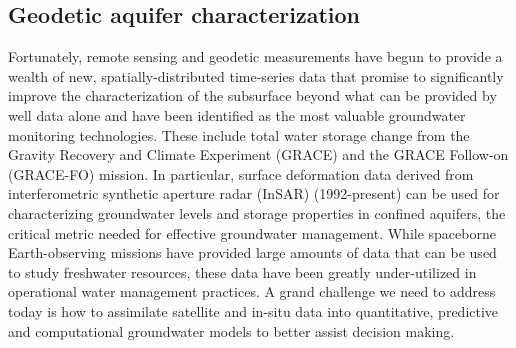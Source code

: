 \documentclass[11pt,final]{article}%
\def\squeeze{\parskip=0pt\itemsep=0pt}
\let\itemOld=\item
\def\item{\squeeze\itemOld}
\begin{document}
\subsection{Geodetic aquifer characterization}
Fortunately, remote sensing and geodetic measurements have begun to provide a wealth of new, spatially-distributed time-series data that promise to significantly improve the characterization of the subsurface beyond what can be provided by well data alone and have been identified as the most valuable groundwater monitoring technologies. These include total water storage change from the Gravity Recovery and Climate Experiment (GRACE) and the GRACE Follow-on (GRACE-FO) mission. In particular, surface deformation data derived from interferometric synthetic aperture radar (InSAR) (1992-present) can be used for characterizing groundwater levels and storage properties in confined aquifers, the critical metric needed for effective groundwater management. While spaceborne Earth-observing missions have provided large amounts of data that can be used to study freshwater resources, these data have been greatly under-utilized in operational water management practices. A grand challenge we need to address today is how to assimilate satellite and in-situ data into quantitative, predictive and computational groundwater models to better assist decision making.






\end{document}
